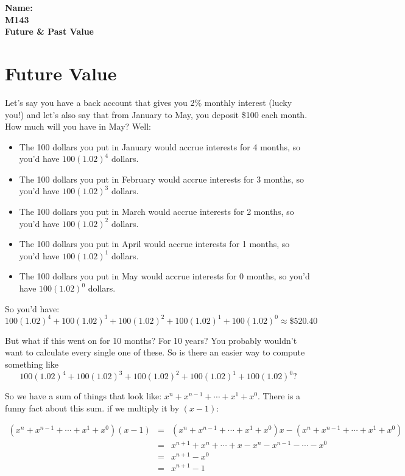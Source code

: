 \documentclass[10pt]{article}
\theoremstyle{definition}
\begin{document}
%

{\bf Name:} \hrulefill\hrulefill\hrulefill\\
{\bf M143} \qquad \qquad \\
{\bf Future \& Past Value}\\ %

\section{Future Value}

Let's say you have a back account that gives you 2\% monthly interest (lucky you!)  and let's also say that from January to May, you deposit \$100 each month.  How much will you have in May? Well:

\begin{itemize}
\item The 100 dollars you put in January would accrue interests for 4 months, so you'd have $100(1.02)^4$ dollars.
\item The 100 dollars you put in February would accrue interests for 3 months, so you'd have $100(1.02)^3$ dollars.
\item The 100 dollars you put in March would accrue interests for 2 months, so you'd have $100(1.02)^2$ dollars.
\item The 100 dollars you put in April would accrue interests for 1 months, so you'd have $100(1.02)^1$ dollars.
\item The 100 dollars you put in May would accrue interests for 0 months, so you'd have $100(1.02)^0$ dollars.
\end{itemize}

So you'd have: $$100(1.02)^4+100(1.02)^3+100(1.02)^2+100(1.02)^1+100(1.02)^0\approx \$520.40$$

But what if this went on for 10 months?  For 10 years?  You probably wouldn't want to calculate every single one of these.  So is there an easier way to compute something like $$100(1.02)^4+100(1.02)^3+100(1.02)^2+100(1.02)^1+100(1.02)^0?$$

So we have a sum of things that look like: $x^n+x^{n-1}+\cdots+x^1+x^0$.  There is a funny fact about this sum.  if we multiply it by $(x-1)$:

\begin{eqnarray*}
(x^n+x^{n-1}+\cdots+x^1+x^0)(x-1)&=&(x^n+x^{n-1}+\cdots+x^1+x^0)x-(x^n+x^{n-1}+\cdots+x^1+x^0)\\
&=&x^{n+1}+x^n+\cdots+x-x^n-x^{n-1}-\cdots-x^0\\
&=&x^{n+1}-x^0\\
&=&x^{n+1}-1
\end{eqnarray*}
\end{document}
